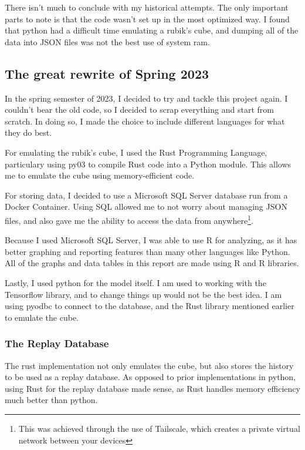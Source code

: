 \documentclass[12pt]{article}
\begin{document}
There isn't much to conclude with my historical attempts. The only important parts to note is that the code wasn't set up in the most optimized way. I found that python had a difficult time emulating a rubik's cube, and dumping all of the data into JSON files was not the best use of system ram.

\newpage

\subsection{The great rewrite of Spring 2023}

In the spring semester of 2023, I decided to try and tackle this project again. I couldn't bear the old code, so I decided to scrap everything and start from scratch. In doing so, I made the choice to include different languages for what they do best.

For emulating the rubik's cube, I used the Rust Programming Language, particulary using py03 to compile Rust code into a Python module. This allows me to emulate the cube using memory-efficient code.

For storing data, I decided to use a Microsoft SQL Server database run from a Docker Container. Using SQL allowed me to not worry about managing JSON files, and also gave me the ability to access the data from anywhere\footnote{This was achieved through the use of Tailscale, which creates a private virtual network between your devices}.

Because I used Microsoft SQL Server, I was able to use R for analyzing, as it has better graphing and reporting features than many other languages like Python. All of the graphs and data tables in this report are made using R and R libraries.

Lastly, I used python for the model itself. I am used to working with the Tensorflow library, and to change things up would not be the best idea. I am using pyodbc to connect to the database, and the Rust library mentioned earlier to emulate the cube.

\subsubsection{The Replay Database}

The rust implementation not only emulates the cube, but also stores the history to be used as a replay database. As opposed to prior implementations in python, using Rust for the replay database made sense, as Rust handles memory efficiency much better than python.
\end{document}
